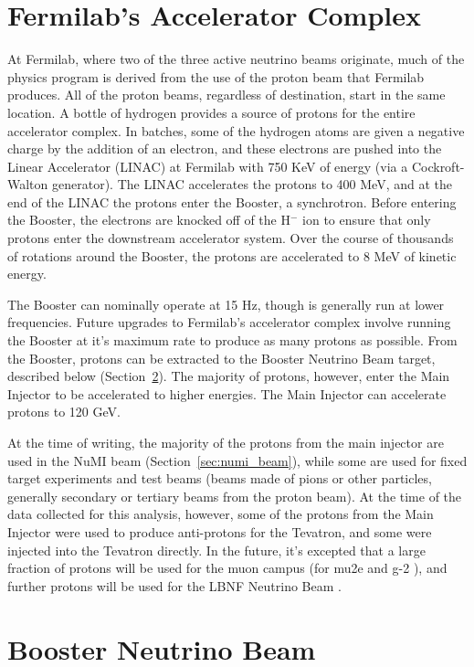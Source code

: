 \section{Fermilab's Accelerator Complex}

At Fermilab, where two of the three active neutrino beams originate, much of the physics program is derived from the use of the proton beam that Fermilab produces.  All of the proton beams, regardless of destination, start in the same location.  A bottle of hydrogen provides a source of protons for the entire accelerator complex.  In batches, some of the hydrogen atoms are given a negative charge by the addition of an electron, and these electrons are pushed into the Linear Accelerator (LINAC) at Fermilab with 750 KeV of energy (via a Cockroft-Walton generator).  The LINAC accelerates the protons to 400 MeV, and at the end of the LINAC the protons enter the Booster, a synchrotron.  Before entering the Booster, the electrons are knocked off of the H$^-$ ion to ensure that only protons enter the downstream accelerator system.  Over the course of thousands of rotations around the Booster, the protons are accelerated to 8 MeV of kinetic energy.

The Booster can nominally operate at 15 Hz, though is generally run at lower frequencies.  Future upgrades to Fermilab's accelerator complex involve running the Booster at it's maximum rate to produce as many protons as possible.  From the Booster, protons can be extracted to the Booster Neutrino Beam target, described below (Section~\ref{sec:bnb}).  The majority of protons, however, enter the Main Injector to be accelerated to higher energies.  The Main Injector can accelerate protons to 120 GeV.

At the time of writing, the majority of the protons from the main injector are used in the NuMI beam (Section~\ref{sec:numi_beam}), while some are used for fixed target experiments and test beams (beams made of pions or other particles, generally secondary or tertiary beams from the proton beam).  At the time of the data collected for this analysis, however, some of the protons from the Main Injector were used to produce anti-protons for the Tevatron, and some were injected into the Tevatron directly.  In the future, it's excepted that a large fraction of protons will be used for the muon campus (for mu2e and g-2 \cite{Bartoszek:2014mya} \cite{Grange:2015fou}), and further protons will be used for the LBNF Neutrino Beam \cite{DUNE}.

\section{Booster Neutrino Beam}
\label{sec:bnb}

